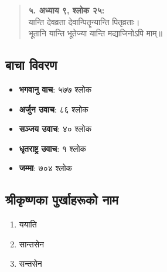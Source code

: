 \documentclass[24pt, a4paper, oneside]{book} %
\begin{document}
{\begin{verse}
\textbf{५. अध्याय ९, श्लोक २५:} \\
यान्ति देवव्रता देवान्पितॄन्यान्ति पितृव्रताः।\\
भूतानि यान्ति भूतेज्या यान्ति मद्याजिनोऽपि माम्॥
\end{verse}

\vspace{0.5em}
\subsection*{बाचा विवरण}
\begin{itemize}
    \item \textbf{भगवानु वाच}: ५७७ श्लोक
    \item \textbf{अर्जुन उवाच}: ८६ श्लोक
    \item \textbf{सञ्जय उवाच}: ४० श्लोक
    \item \textbf{धृतराष्ट्र उवाच}: १ श्लोक
    \item \textbf{जम्मा}: ७०४ श्लोक
\end{itemize}

\vspace{1em}
\subsection*{श्रीकृष्णका पुर्खाहरूको नाम}

\begin{multicols}{3}
\begin{enumerate}
\item ययाति
\item सान्तसेन
\item सन्तसेन
\end{enumerate}
\end{multicols}
}

\newpage
\thispagestyle{empty} %
\end{document}
